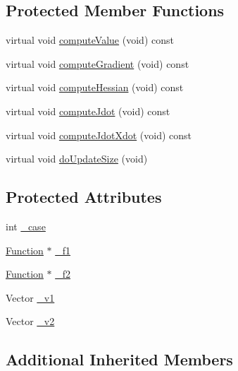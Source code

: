 \subsection*{Protected Member Functions}
\begin{DoxyCompactItemize}
\item 
virtual void \hyperlink{classocra_1_1SubtractionFunction_a4cdbb66a83d1113ecea252898ec1bda3}{compute\+Value} (void) const
\item 
virtual void \hyperlink{classocra_1_1SubtractionFunction_a117739796f68e8cf8e8931606ff09443}{compute\+Gradient} (void) const
\item 
virtual void \hyperlink{classocra_1_1SubtractionFunction_ac6558a3de7573facbc7a4d1b03128e43}{compute\+Hessian} (void) const
\item 
virtual void \hyperlink{classocra_1_1SubtractionFunction_a2bbae38f5ddcfacb9bc5f4114ffb7b02}{compute\+Jdot} (void) const
\item 
virtual void \hyperlink{classocra_1_1SubtractionFunction_aeca1fe085ed1302c87e7ed4ee80082ed}{compute\+Jdot\+Xdot} (void) const
\item 
virtual void \hyperlink{classocra_1_1SubtractionFunction_abeccbd4ec6cabf7bf18169e052a993d5}{do\+Update\+Size} (void)
\end{DoxyCompactItemize}
\subsection*{Protected Attributes}
\begin{DoxyCompactItemize}
\item 
int \hyperlink{classocra_1_1SubtractionFunction_a2acdf28df1d3018d7c25cb8b16c879d1}{\+\_\+case}
\item 
\hyperlink{classocra_1_1Function}{Function} $\ast$ \hyperlink{classocra_1_1SubtractionFunction_a9adc6a235a48bdf90fe1ad4d4a18b7a0}{\+\_\+f1}
\item 
\hyperlink{classocra_1_1Function}{Function} $\ast$ \hyperlink{classocra_1_1SubtractionFunction_a22e626b681ffd6b9dd90ec4189ad431c}{\+\_\+f2}
\item 
Vector \hyperlink{classocra_1_1SubtractionFunction_a802ca5db967765779131701423f1b207}{\+\_\+v1}
\item 
Vector \hyperlink{classocra_1_1SubtractionFunction_a10736fb0de7f83a54a09055251cf4ad5}{\+\_\+v2}
\end{DoxyCompactItemize}
\subsection*{Additional Inherited Members}


